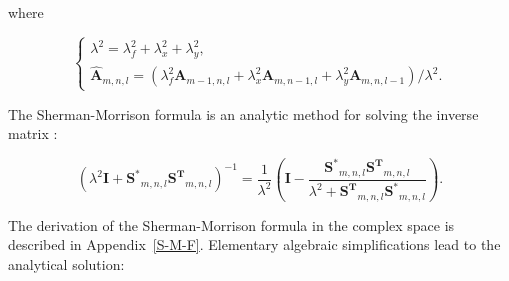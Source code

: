 where
\begin{small}
    \begin{equation}
        \label{eq:coef}
        \begin{cases}
            \lambda^{2} = \lambda_{f}^{2} + \lambda_{x}^{2} + \lambda_{y}^{2}, \\
            \mathbf{\hat{A}}_{m,n,l} = ( \lambda_{f}^{2} \mathbf{A}_{m-1,n,l} +
            \lambda_{x}^{2} \mathbf{A}_{m,n-1,l} +
            \lambda_{y}^{2} \mathbf{A}_{m,n,l-1} ) / \lambda^{2}.
        \end{cases}
    \end{equation}
\end{small}
The Sherman-Morrison formula is an analytic method for solving the
inverse matrix \cite{Hager89}:
\begin{small}
    \begin{equation}
        \label{eq:inverse}
        ( \lambda^{2}\mathbf{I} + \mathbf{S^{*}}_{m,n,l} \mathbf{S^{T}}_{m,n,l} )^{-1}
        = \frac{ 1 } { \lambda^{2}  }
        ( \mathbf{I} - \frac{ \mathbf{S^{*}}_{m,n,l} \mathbf{S^{T}}_{m,n,l} }
        { \lambda^{2} + \mathbf{S^{T}}_{m,n,l} \mathbf{S^{*}}_{m,n,l} }).
    \end{equation}
\end{small}
The derivation of the Sherman-Morrison formula in the complex space is
described in Appendix~\ref{S-M-F}.  Elementary algebraic
simplifications lead to the analytical solution:
